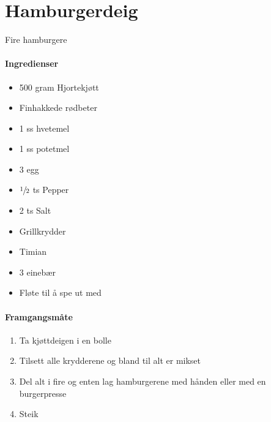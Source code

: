 \section{﻿Hamburgerdeig}
Fire hamburgere

%
\paragraph{Ingredienser}
\begin{itemize}[noitemsep]
	\item 500 gram Hjortekjøtt
	\item	Finhakkede rødbeter
	\item	1 ss hvetemel
	\item	1 ss potetmel
	\item	3 egg
	\item	 $\sfrac{1}{2}$  ts Pepper
	\item	2 ts Salt
	\item	Grillkrydder
	\item	Timian
	\item	3 einebær
	\item	Fløte til å spe ut med
\end{itemize}

\paragraph{Framgangsmåte}
\begin{enumerate}[noitemsep]
	\item Ta kjøttdeigen i en bolle
	\item Tilsett alle krydderene og bland til alt er mikset
	\item Del alt i fire og enten lag hamburgerene med hånden eller med en burgerpresse
	\item Steik
\end{enumerate}

